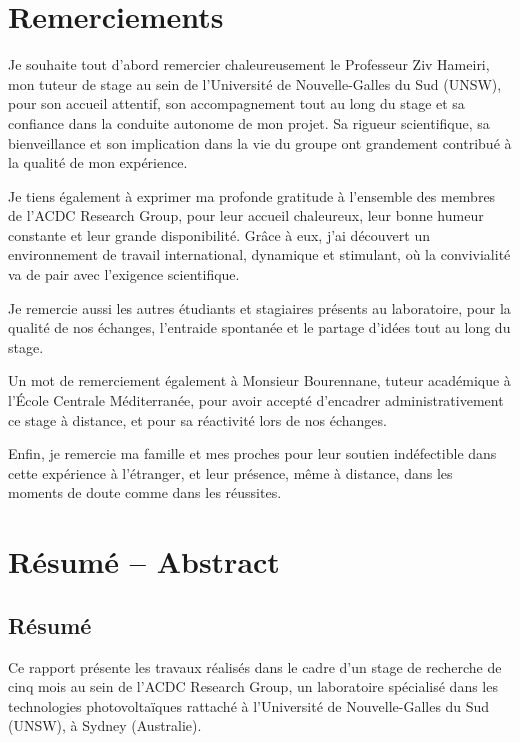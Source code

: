 \documentclass[12pt,a4paper]{report}
\begin{document}
\chapter*{Remerciements}

Je souhaite tout d'abord remercier chaleureusement le Professeur Ziv Hameiri, mon tuteur de stage au sein de l'Université de Nouvelle-Galles du Sud (UNSW), pour son accueil attentif, son accompagnement tout au long du stage et sa confiance dans la conduite autonome de mon projet. Sa rigueur scientifique, sa bienveillance et son implication dans la vie du groupe ont grandement contribué à la qualité de mon expérience.

Je tiens également à exprimer ma profonde gratitude à l'ensemble des membres de l'ACDC Research Group, pour leur accueil chaleureux, leur bonne humeur constante et leur grande disponibilité. Grâce à eux, j'ai découvert un environnement de travail international, dynamique et stimulant, où la convivialité va de pair avec l'exigence scientifique.

Je remercie aussi les autres étudiants et stagiaires présents au laboratoire, pour la qualité de nos échanges, l'entraide spontanée et le partage d'idées tout au long du stage.

Un mot de remerciement également à Monsieur Bourennane, tuteur académique à l'École Centrale Méditerranée, pour avoir accepté d'encadrer administrativement ce stage à distance, et pour sa réactivité lors de nos échanges.

Enfin, je remercie ma famille et mes proches pour leur soutien indéfectible dans cette expérience à l'étranger, et leur présence, même à distance, dans les moments de doute comme dans les réussites.

\chapter*{Résumé -- Abstract}

\section*{Résumé}
Ce rapport présente les travaux réalisés dans le cadre d'un stage de recherche de cinq mois au sein de l'ACDC Research Group, un laboratoire spécialisé dans les technologies photovoltaïques rattaché à l'Université de Nouvelle-Galles du Sud (UNSW), à Sydney (Australie).
\end{document}
